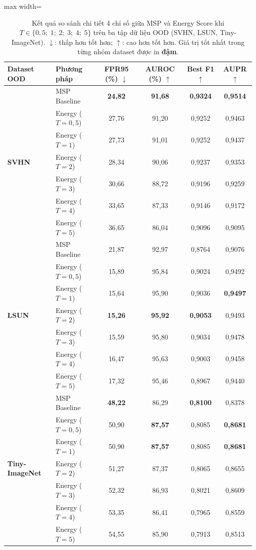 \documentclass[12pt,a4paper]{article}
\begin{document}
\begin{table}[H]
  \centering
  \caption{Kết quả so sánh chi tiết 4 chỉ số giữa MSP và Energy Score khi $T \in \{0{,}5;\;1;\;2;\;3;\;4;\;5\}$ trên ba tập dữ liệu OOD (SVHN, LSUN, Tiny-ImageNet). $\downarrow$: thấp hơn tốt hơn; $\uparrow$: cao hơn tốt hơn. Giá trị tốt nhất trong từng nhóm dataset được in \textbf{đậm}.}
  \label{tab:temp_results}
  \renewcommand{\arraystretch}{1.2}
  \begin{adjustbox}{max width=\linewidth}
        \begin{tabular}{llcccc}
    \hline
    \textbf{Dataset OOD} & \textbf{Phương pháp} & \textbf{FPR95 (\%) $\downarrow$} & \textbf{AUROC (\%) $\uparrow$} & \textbf{Best F1 $\uparrow$} & \textbf{AUPR $\uparrow$} \\
    \hline
    \multirow{7}{*}{\textbf{SVHN}}
    & MSP Baseline & \textbf{24,82} & \textbf{91,68} & \textbf{0,9324} & \textbf{0,9514} \\
    & Energy ($T=0,5$) & 27,76 & 91,20 & 0,9252 & 0,9463 \\
    & Energy ($T=1$) & 27,73 & 91,01 & 0,9252 & 0,9437 \\
    & Energy ($T=2$) & 28,34 & 90,06 & 0,9237 & 0,9353 \\
    & Energy ($T=3$) & 30,66 & 88,72 & 0,9196 & 0,9259 \\
    & Energy ($T=4$) & 33,65 & 87,33 & 0,9146 & 0,9172 \\
    & Energy ($T=5$) & 36,65 & 86,04 & 0,9096 & 0,9095 \\
    \hline
    \multirow{7}{*}{\textbf{LSUN}}
    & MSP Baseline & 21,87 & 92,97 & 0,8764 & 0,9076 \\
    & Energy ($T=0,5$) & 15,89 & 95,84 & 0,9024 & 0,9492 \\
    & Energy ($T=1$) & 15,64 & 95,90 & 0,9036 & \textbf{0,9497} \\
    & Energy ($T=2$) & \textbf{15,26} & \textbf{95,92} & \textbf{0,9053} & 0,9493 \\
    & Energy ($T=3$) & 15,59 & 95,80 & 0,9034 & 0,9478 \\
    & Energy ($T=4$) & 16,47 & 95,63 & 0,9003 & 0,9458 \\
    & Energy ($T=5$) & 17,32 & 95,46 & 0,8967 & 0,9440 \\
    \hline
    \multirow{7}{*}{\textbf{Tiny-ImageNet}}
    & MSP Baseline & \textbf{48,22} & 86,29 & \textbf{0,8100} & 0,8378 \\
    & Energy ($T=0,5$) & 50,90 & \textbf{87,57} & 0,8085 & \textbf{0,8681} \\
    & Energy ($T=1$) & 50,90 & \textbf{87,57} & 0,8085 & \textbf{0,8681} \\
    & Energy ($T=2$) & 51,27 & 87,37 & 0,8065 & 0,8655 \\
    & Energy ($T=3$) & 52,32 & 86,93 & 0,8021 & 0,8609 \\
    & Energy ($T=4$) & 53,35 & 86,41 & 0,7965 & 0,8559 \\
    & Energy ($T=5$) & 54,55 & 85,90 & 0,7913 & 0,8513 \\
    \hline
  \end{tabular}
  \end{adjustbox}
\end{table}
\end{document}
